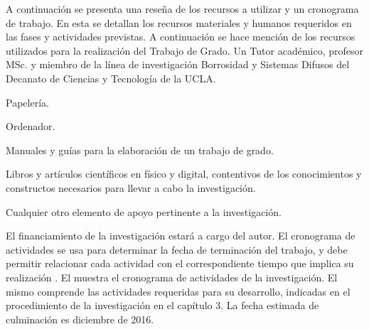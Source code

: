 A continuación se presenta una reseña de los recursos a utilizar y un cronograma de trabajo. En esta se detallan los recursos materiales y humanos requeridos en las fases y actividades previstas.
A continuación se hace mención de los recursos utilizados para la realización del Trabajo de Grado.
	Un Tutor académico, profesor MSc. y miembro de la línea de investigación Borrosidad y Sistemas Difusos del Decanato de Ciencias y Tecnología de la UCLA.
	\begin{viñetas}
		\item Papelería.
		\item Ordenador.
		\item Manuales y guías para la elaboración de un trabajo de grado.
		\item Libros y artículos científicos en físico y digital, contentivos de los conocimientos y constructos necesarios para llevar a cabo la investigación.
		\item Cualquier otro elemento de apoyo pertinente a la investigación.
	\end{viñetas}
	El financiamiento de la investigación estará a cargo del autor.
El cronograma de actividades se usa para determinar la fecha de terminación del trabajo, y debe permitir relacionar cada actividad con el correspondiente tiempo que implica su realización \cite[]{UNEXPOmanual2004}.
El  muestra el cronograma de actividades de la investigación. El mismo comprende las actividades requeridas para su desarrollo, indicadas en el procedimiento de la investigación en el capítulo 3. La fecha estimada de culminación es diciembre de 2016. 

